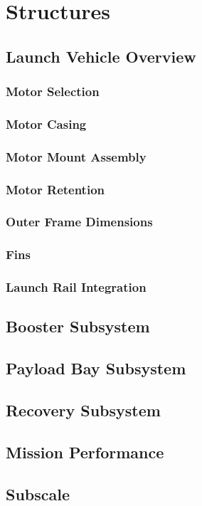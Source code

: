 \chapter{Structures}

\section{Launch Vehicle Overview}
    \subsection{Motor Selection}

    \subsection{Motor Casing}


    \subsection{Motor Mount Assembly}


    \subsection{Motor Retention}


    \subsection{Outer Frame Dimensions}


    \subsection{Fins}


    \subsection{Launch Rail Integration}

\section{Booster Subsystem}
\section{Payload Bay Subsystem}
\section{Recovery Subsystem}
\section{Mission Performance}
\section{Subscale}
